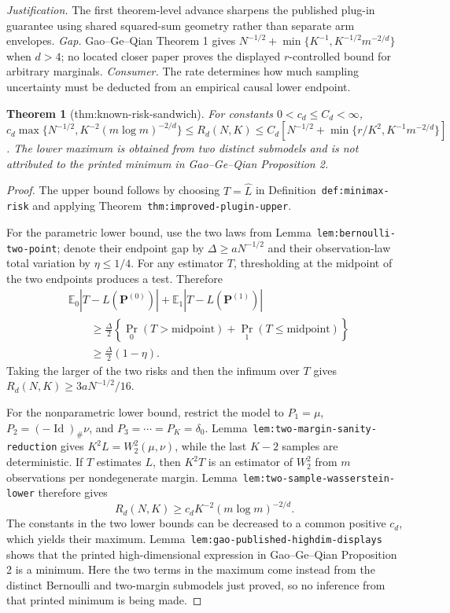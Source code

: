 \documentclass{article}
\newtheorem{theorem}{Theorem}
\begin{document}
\par\smallskip\noindent \textit{Justification.} The first theorem-level advance sharpens the published plug-in guarantee using shared squared-sum geometry rather than separate arm envelopes. \textit{Gap.} Gao--Ge--Qian Theorem 1 gives \(N^{-1/2}+\min\{K^{-1},K^{-1/2}m^{-2/d}\}\) when \(d>4\); no located closer paper proves the displayed \(r\)-controlled bound for arbitrary marginals. \textit{Consumer.} The rate determines how much sampling uncertainty must be deducted from an empirical causal lower endpoint.

\begin{theorem}[thm:known-risk-sandwich]\label{thm:known-risk-sandwich}
For constants \(0<c_d\le C_d<\infty\), \(c_d\max\{N^{-1/2},K^{-2}(m\log m)^{-2/d}\}\le R_d(N,K)\le C_d[N^{-1/2}+\min\{r/K^2,K^{-1}m^{-2/d}\}]\). The lower maximum is obtained from two distinct submodels and is not attributed to the printed minimum in Gao--Ge--Qian Proposition 2.
\end{theorem}
\begin{proof}
The upper bound follows by choosing \(T=\widehat L\) in Definition~\texttt{def:minimax-risk} and applying Theorem~\texttt{thm:improved-plugin-upper}.

For the parametric lower bound, use the two laws from Lemma~\texttt{lem:bernoulli-two-point}; denote their endpoint gap by \(\Delta\ge aN^{-1/2}\) and their observation-law total variation by \(\eta\le1/4\). For any estimator \(T\), thresholding at the midpoint of the two endpoints produces a test. Therefore
\[
\begin{aligned}
&\mathbb E_0|T-L(\mathbf P^{(0)})|+\mathbb E_1|T-L(\mathbf P^{(1)})|\\
&\qquad\ge\frac\Delta2\left\{\Pr_0(T>\text{midpoint})+\Pr_1(T\le\text{midpoint})\right\}\\
&\qquad\ge\frac\Delta2(1-\eta).
\end{aligned}
\]
Taking the larger of the two risks and then the infimum over \(T\) gives \(R_d(N,K)\ge3aN^{-1/2}/16\).

For the nonparametric lower bound, restrict the model to \(P_1=\mu\), \(P_2=(-\operatorname{Id})_{\#}\nu\), and \(P_3=\cdots=P_K=\delta_0\). Lemma~\texttt{lem:two-margin-sanity-reduction} gives \(K^2L=W_2^2(\mu,\nu)\), while the last \(K-2\) samples are deterministic. If \(T\) estimates \(L\), then \(K^2T\) is an estimator of \(W_2^2\) from \(m\) observations per nondegenerate margin. Lemma~\texttt{lem:two-sample-wasserstein-lower} therefore gives
\[
R_d(N,K)\ge c_dK^{-2}(m\log m)^{-2/d}. \tag{19}
\]
The constants in the two lower bounds can be decreased to a common positive \(c_d\), which yields their maximum. Lemma~\texttt{lem:gao-published-highdim-displays} shows that the printed high-dimensional expression in Gao--Ge--Qian Proposition 2 is a minimum. Here the two terms in the maximum come instead from the distinct Bernoulli and two-margin submodels just proved, so no inference from that printed minimum is being made.
\end{proof}
\end{document}
